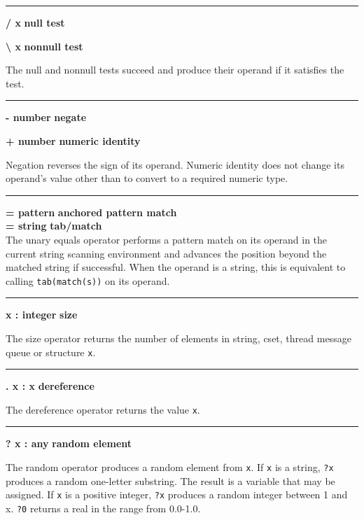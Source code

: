 \bigskip\hrule\vspace{0.1cm}
\noindent
{\bf / x } \hfill {\bf null test}

\noindent
{\bf {\textbackslash} x } \hfill {\bf nonnull test}

\noindent
The null and nonnull tests succeed
and produce their operand if it satisfies the test.

\bigskip\hrule\vspace{0.1cm}
\noindent
{\bf {}- number } \hfill {\bf negate}

\noindent
{\bf + number } \hfill {\bf numeric identity}

\noindent
Negation reverses the sign of its operand. Numeric identity does not
change its operand's value other than to convert to a
required numeric type.

\bigskip\hrule\vspace{0.1cm}
\noindent
{\bf = pattern } \hfill {\bf anchored pattern match} \\
{\bf = string } \hfill {\bf tab/match} \\

\noindent
{}The unary equals operator
performs a pattern match on its operand in the current string scanning
environment and advances the position beyond the matched string
if successful.
When the operand is a string, this is
equivalent to calling \texttt{tab(match(s))} on its operand.

\bigskip\hrule\vspace{0.1cm}
\noindent
{\bf * x : integer } \hfill {\bf size}

\noindent
The size operator returns the number of elements in
string, cset, thread message queue or structure \texttt{x}.

\bigskip\hrule\vspace{0.1cm}
\noindent
{\bf . x : x } \hfill {\bf dereference}

\noindent
The dereference operator returns the value
\texttt{x}.

\bigskip\hrule\vspace{0.1cm}
\noindent
{\bf ? x : any } \hfill {\bf random element}

\noindent
The random operator produces a random element
from \texttt{x}. If \texttt{x} is a string, \texttt{?x} produces a
random one-letter substring. The result is a variable that may be
assigned. If \texttt{x} is a positive integer, \texttt{?x} produces a
random integer between 1 and x.  \texttt{?0} returns a real in the
range from 0.0-1.0.

